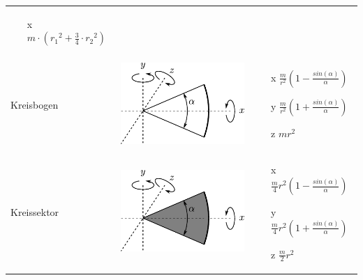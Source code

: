 \begin{table}[h!]
\begin{tabular}{m{2cm} c m{}}
\begin{itemize}
			\item[x] $m \cdot \left({r_1}^2 + \frac{3}{4}
				\cdot {r_2}^2\right)$
		\end{itemize} \\
Kreisbogen &
	\begin{minipage}{0.3\textwidth}
	\centering
	\includegraphics[scale=\traegscale]{traeg-kreisbogen.pdf}
	\end{minipage} &
		\begin{itemize}
		\item[x] $\frac{m}{r^2} 
			\left(1-\frac{sin(\alpha)}{\alpha} \right)$
		\item[y]  $\frac{m}{r^2} 
			\left(1+\frac{sin(\alpha)}{\alpha} \right)$
		\item[z] $mr^2$
		\end{itemize} \\
Kreissektor &
	\begin{minipage}{0.3\textwidth}
	\centering
	\includegraphics[scale=\traegscale]{traeg-kreissektor.pdf}
	\end{minipage} &
		\begin{itemize}
		\item[x] $\frac{m}{4} r^2  
			\left(1-\frac{sin(\alpha)}{\alpha} \right)$
		\item[y]  $\frac{m}{4} r^2 
			\left(1+\frac{sin(\alpha)}{\alpha} \right)$
		\item[z] $\frac{m}{2} r^2$	

\end{itemize}
\end{tabular}
\end{table}
